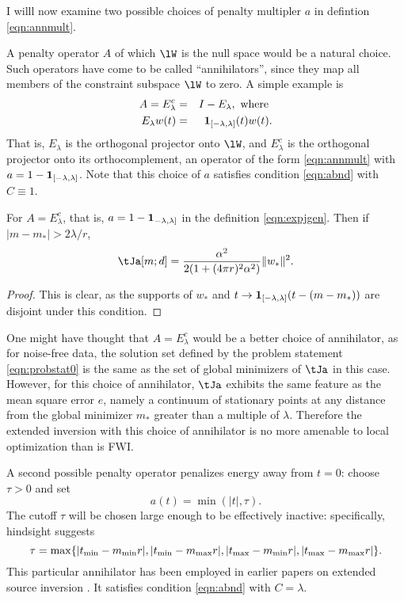 I willl now examine two possible choices of penalty multipler $a$ in
defintion \ref{eqn:annmult}.

A penalty operator $A$ of which $\lW$ is the null space would be a
natural choice. Such operators have come to be called
``annihilators'', since they map all members of the constraint
subspace $\lW$ to zero.  A simple example is
\begin{eqnarray}
  A = E^c_{\lambda}&=&I - E_{\lambda},\mbox{ where } \nonumber \\
  E_{\lambda}w(t) &=&{\bf 1}_{[-\lambda,\lambda]}(t)w(t). 
                      \label{eqn:ann0}
\end{eqnarray}
That is, $E_{\lambda}$ is the orthogonal projector onto $\lW$,
and $E_{\lambda}^c$ is the orthogonal projector onto its
orthocomplement, an operator of the form \ref{eqn:annmult} with $a
= 1 - {\bf 1}_{[-\lambda,\lambda]}$. Note that this choice of $a$
satisfies condition \ref{eqn:abnd} with $C \equiv 1$.

\begin{theorem}
  \label{thm:boxcarbad}
  For $A=E^c_{\lambda}$, that is, $a=1-{\bf 1}_{-\lambda,\lambda]}$ in
  the definition \ref{eqn:expjgen}. Then if $|m-m_*| >  2\lambda/r$,
  \[
    \tJa[m;d] = \frac{\alpha^2}{2(1+(4 \pi r)^2 \alpha^2)}\|w_*\|^2.
  \]
\end{theorem}

\begin{proof}
  This is clear, as the supports of $w_*$ and $t \rightarrow {\bf
    1}_{[-\lambda,\lambda]}(t-(m-m_*))$ are disjoint under this
  condition.
\end{proof}

One might have thought that $A=E^c_{\lambda}$ would be a better choice
of annihilator, as for noise-free
data, the solution set defined by the problem statement
\ref{eqn:probstat0} is the same as the set of global minimizers of
$\tJa$ in this case. However, for this choice of annihilator,
$\tJa$ exhibits the same feature as the mean square error $e$, namely
a continuum of stationary points at any distance from the global
minimizer $m_*$ greater than a multiple of $\lambda$. Therefore the
extended inversion with this choice of annihilator is no more amenable
to local optimization than is FWI. 

A second possible 
penalty operator penalizes energy away from 
$t=0$: choose $\tau > 0$ and set 
\begin{equation}
  \label{eqn:ann}
  a(t) = \min(|t|, \tau). 
\end{equation}
The cutoff $\tau$ will be chosen large enough to be effectively inactive: 
specifically, hindsight suggests 
\begin{equation}
  \label{eqn:taudef}
  \tau = \max\{|t_{\rm min}-m_{\rm min}r|,|t_{\rm min}-m_{\rm max}r|, |t_{\rm max}-m_{\rm min}r|, |t_{\rm max}-m_{\rm max}r|\}. 
\end{equation}
This 
particular annihilator has been employed in earlier papers on extended 
source inversion 
\cite[]{Plessix:00a,LuoSava:11,Warner:14,HuangSymes:SEG15a,Warner:16,HuangSymes:GEO17}. It
satisfies condition \ref{eqn:abnd} with $C=\lambda$.

